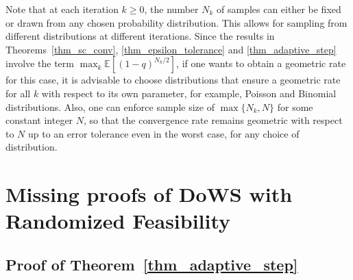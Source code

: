 \documentclass{article}
\theoremstyle{plain}
\theoremstyle{definition}
\theoremstyle{remark}
\begin{document}
Note that at each iteration \(k \geq 0\), the number \(N_k\) of samples  can either be fixed or drawn from any chosen probability distribution. This allows for sampling from different distributions at different iterations. Since the results in Theorems~\ref{thm_sc_conv}, \ref{thm_epsilon_tolerance} and \ref{thm_adaptive_step} involve the term \(\max_k \mathbb{E}[(1 - q)^{N_k / 2}]\), if one wants to obtain a geometric rate for this case, it is advisable to choose distributions that ensure a geometric rate for all $k$ with respect to its own parameter, for example, Poisson and Binomial distributions. Also, one can enforce sample size of \( \max \{N_k, N\} \) for some constant integer \(N\), so that the convergence rate remains geometric with respect to $N$ up to an error tolerance even in the worst case, for any choice of distribution.







\section{Missing proofs of DoWS with Randomized Feasibility}

\subsection{Proof of Theorem~\ref{thm_adaptive_step}}\label{thm_adaptive_step_proof}
\end{document}
